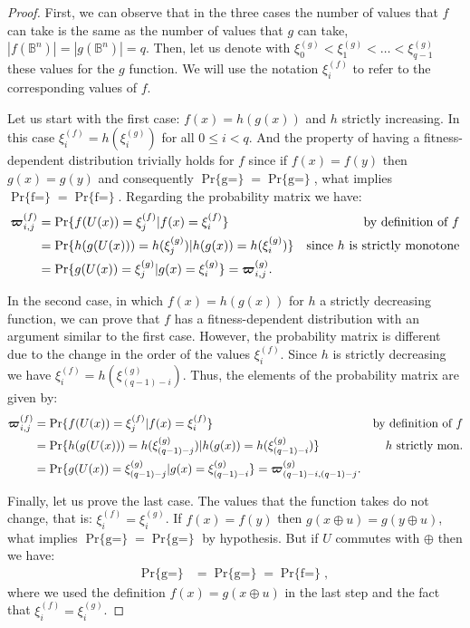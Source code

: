 \documentclass{article}
\def\vec#1{\mathchoice{\mbox{\boldmath$\displaystyle#1$}}
  {\mbox{\boldmath$\textstyle#1$}}
  {\mbox{\boldmath$\scriptstyle#1$}}
  {\mbox{\boldmath$\scriptscriptstyle#1$}}}
\newcommand{\Bo}[0]{\mathbb{B}}
\newcommand{\Prob}[1]{\mathop{\mathrm{Pr}\{#1\}}}
\newcommand{\ProbCond}[2]{\mathop{\mathrm{Pr}\{#1|#2\}}}
\begin{document}
\begin{proof}
First, we can observe that in the three cases the number of values that $f$ can take is the same as the number of values that $g$ can take, $|f(\Bo^n)|=|g(\Bo^n)|=q$. Then, let us denote with $\xi_0^{(g)} < \xi_1^{(g)} < \ldots < \xi_{q-1}^{(g)}$ these values for the $g$ function. We will use the notation $\xi_i^{(f)}$ to refer to the corresponding values of $f$.

Let us start with the first case: $f(x) = h(g(x))$ and $h$ strictly increasing. In this case $\xi_i^{(f)}=h(\xi_i^{(g)})$ for all $0 \leq i < q$. And the property of having a fitness-dependent distribution trivially holds for $f$ since if $f(x)=f(y)$ then $g(x)=g(y)$ and consequently $\Prob{g(U(x))=\xi_j^{(g)}} = \Prob{g(U(y))=\xi_j^{(g)}}$, what implies $\Prob{f(U(x))=\xi_j^{(f)}} = \Prob{f(U(y))=\xi_j^{(f)}}$. Regarding the probability matrix we have:
\begin{align}
\vec{\varpi}^{(f)}_{i,j} &= \ProbCond{f(U(x))=\xi_j^{(f)}}{f(x)=\xi_i^{(f)}} & \text{by definition of $f$} \nonumber \\
&= \ProbCond{h(g(U(x)))=h(\xi_j^{(g)})}{h(g(x))=h(\xi_i^{(g)})} & \text{since $h$ is strictly monotone} \nonumber \\
&= \ProbCond{g(U(x))=\xi_j^{(g)}}{g(x)=\xi_i^{(g)}} = \vec{\varpi}^{(g)}_{i,j}.
\end{align}

In the second case, in which $f(x) = h(g(x))$ for $h$ a strictly decreasing function, we can prove that $f$ has a fitness-dependent distribution with an argument similar to the first case. However, the probability matrix is different due to the change in the order of the values $\xi_i^{(f)}$. Since $h$ is strictly decreasing we have $\xi_i^{(f)}=h(\xi_{(q-1)-i}^{(g)})$. Thus, the elements of the probability matrix are given by:
\begin{align}
\vec{\varpi}^{(f)}_{i,j} &= \ProbCond{f(U(x))=\xi_j^{(f)}}{f(x)=\xi_i^{(f)}} & \text{by definition of $f$} \nonumber \\
&= \ProbCond{h(g(U(x)))=h( \xi_{(q-1)-j}^{(g)})}{h( g(x))=h(\xi_{(q-1)-i}^{(g)})} & \text{$h$ strictly mon.} \nonumber \\
&= \ProbCond{g(U(x))=\xi_{(q-1)-j}^{(g)}}{g(x)=\xi_{(q-1)-i}^{(g)}} = \vec{\varpi}^{(g)}_{(q-1)-i,(q-1)-j}.
\end{align}

Finally, let us prove the last case. The values that the function takes do not change, that is: $\xi_i^{(f)} = \xi_i^{(g)}$. If $f(x)=f(y)$ then $g(x \oplus u)=g(y \oplus u)$, what implies $\Prob{g(U(x\oplus u))=\xi_j^{(g)}} = \Prob{g(U(y \oplus u))=\xi_j^{(g)}}$ by hypothesis. But if $U$ commutes with $\oplus$ then we have:
\begin{align}
\Prob{g(U(x\oplus u))=\xi_j^{(g)}} &= \Prob{g(U(x)\oplus u)=\xi_j^{(g)}} = \Prob{f(U(x))=\xi_j^{(f)}} ,
\end{align}
where we used the definition $f(x)=g(x \oplus u)$ in the last step and the fact that $\xi_i^{(f)} = \xi_i^{(g)}$.


\end{proof}
\end{document}
